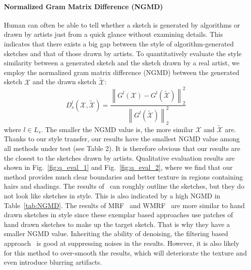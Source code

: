 \documentclass[10pt,twocolumn,letterpaper]{article}
\begin{document}
\paragraph*{Normalized Gram Matrix Difference (NGMD)} Human can often be able to tell whether a sketch is generated by algorithms or drawn by artists just from a quick glance without examining details. This indicates that there exists a big gap between the style of algorithm-generated sketches and that of those drawn by artists. To quantitatively evaluate the style similarity between a generated sketch and the sketch drawn by a real artist, we employ the normalized gram matrix difference (NGMD) between the generated sketch $\mathcal{X}$ and the drawn sketch ${\tilde {\mathcal{X}}}$:
\begin{equation}
{D^l_s}\left( {\mathcal{X},\tilde {\mathcal{X}}} \right) = \frac{{\left\| {{G^l}\left( \mathcal{X} \right) - {G^l}\left( {\tilde {\mathcal{X}}} \right)} \right\|_2^2}}{{\left\| {{G^l}\left( {\tilde {\mathcal{X}}} \right)} \right\|_2^2}}
\label{eq:style_exp}
\end{equation}
where $l\in L_s$. The smaller the NGMD value is, the more similar $\mathcal{X}$ and ${\tilde {\mathcal{X}}}$ are. Thanks to our style transfer, our results have the smallest NGMD value among all methods under test (see Table 2). It is therefore obvious that our results are the closest to the sketches drawn by artists. 
Qualitative evaluation results are shown in Fig.~\ref{fig:q_eval_1} and Fig.~\ref{fig:q_eval_2}, where we find that our method provides much clear boundaries and better texture in regions containing hairs and shadings. The results of~\cite{zhang2015end} can roughly outline the sketches, but they do not look like sketches in style. This is also indicated by a high NGMD in Table~\ref{tab:NGMD}. The results of MRF~\cite{wang2009face} and WMRF~\cite{zhou2012markov} are more similar to hand drawn sketches in style since these exemplar based approaches use patches of hand drawn sketches to make up the target sketch. That is why they have a smaller NGMD value. Inheriting the ability of denoising, the filtering based approach~\cite{song2014real} is good at suppressing noises in the results. However, it is also likely for this method to over-smooth the results, which will deteriorate the texture and even introduce blurring artifacts. 
\end{document}
